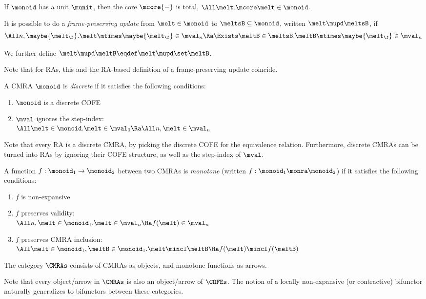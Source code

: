 \begin{lem}\label{lem:cmra-unit-total-core}
  If $\monoid$ has a unit $\munit$, then the core $\mcore{{-}}$ is total, \ie $\All\melt. \mcore\melt \in \monoid$.
\end{lem}

\begin{defn}
  It is possible to do a \emph{frame-preserving update} from $\melt \in \monoid$ to $\meltsB \subseteq \monoid$, written $\melt \mupd \meltsB$, if
  \[ \All n, \maybe{\melt_\f}. \melt \mtimes \maybe{\melt_\f} \in \mval_n \Ra \Exists \meltB \in \meltsB. \meltB \mtimes \maybe{\melt_\f} \in \mval_n \]

  We further define $\melt \mupd \meltB \eqdef \melt \mupd \set\meltB$.
\end{defn}
Note that for RAs, this and the RA-based definition of a frame-preserving update coincide.

\begin{defn}
  A CMRA $\monoid$ is \emph{discrete} if it satisfies the following conditions:
  \begin{enumerate}[itemsep=0pt]
  \item $\monoid$ is a discrete COFE
  \item $\mval$ ignores the step-index: \\
    $\All \melt \in \monoid. \melt \in \mval_0 \Ra \All n, \melt \in \mval_n$
  \end{enumerate}
\end{defn}
Note that every RA is a discrete CMRA, by picking the discrete COFE for the equivalence relation.
Furthermore, discrete CMRAs can be turned into RAs by ignoring their COFE structure, as well as the step-index of $\mval$.

\begin{defn}
  A function $f : \monoid_1 \to \monoid_2$ between two CMRAs is \emph{monotone} (written $f : \monoid_1 \monra \monoid_2$) if it satisfies the following conditions:
  \begin{enumerate}[itemsep=0pt]
  \item $f$ is non-expansive
  \item $f$ preserves validity: \\
    $\All n, \melt \in \monoid_1. \melt \in \mval_n \Ra f(\melt) \in \mval_n$
  \item $f$ preserves CMRA inclusion:\\
    $\All \melt \in \monoid_1, \meltB \in \monoid_1. \melt \mincl \meltB \Ra f(\melt) \mincl f(\meltB)$
  \end{enumerate}
\end{defn}

\begin{defn}
  The category $\CMRAs$ consists of CMRAs as objects, and monotone functions as arrows.
\end{defn}
Note that every object/arrow in $\CMRAs$ is also an object/arrow of $\COFEs$.
The notion of a locally non-expansive (or contractive) bifunctor naturally generalizes to bifunctors between these categories.

